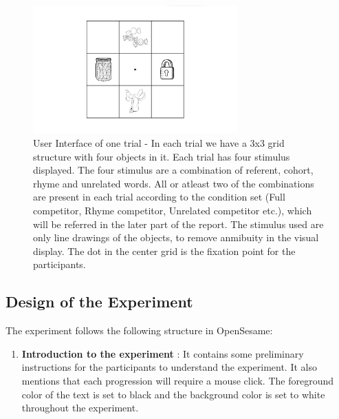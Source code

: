 \documentclass[
  a4paper,
]{article}
\providecommand{\tightlist}{%
  \setlength{\itemsep}{0pt}\setlength{\parskip}{0pt}}\usepackage{longtable,booktabs,array}
\begin{document}
\begin{figure}

{\centering \includegraphics[width=0.7\textwidth,height=\textheight]{img/stim_grid.png}

}

\caption{\label{fig-ui}User Interface of one trial - In each trial we
have a 3x3 grid structure with four objects in it. Each trial has four
stimulus displayed. The four stimulus are a combination of referent,
cohort, rhyme and unrelated words. All or atleast two of the
combinations are present in each trial according to the condition set
(Full competitor, Rhyme competitor, Unrelated competitor etc.), which
will be referred in the later part of the report. The stimulus used are
only line drawings of the objects, to remove anmibuity in the visual
display. The dot in the center grid is the fixation point for the
participants.}

\end{figure}

\hypertarget{design-of-the-experiment}{%
\subsection{Design of the Experiment}\label{design-of-the-experiment}}

The experiment follows the following structure in OpenSesame:

\begin{enumerate}
\def\labelenumi{\arabic{enumi}.}
\tightlist
\item
  \textbf{Introduction to the experiment} : It contains some preliminary
  instructions for the participants to understand the experiment. It
  also mentions that each progression will require a mouse click. The
  foreground color of the text is set to black and the background color
  is set to white throughout the experiment.
\end{enumerate}
\end{document}
